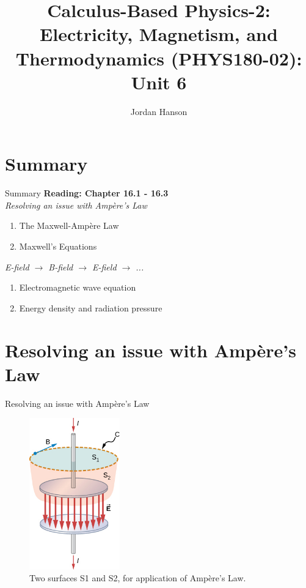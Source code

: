 \documentclass{beamer}
\title{Calculus-Based Physics-2: Electricity, Magnetism, and Thermodynamics (PHYS180-02): Unit 6}
\author{Jordan Hanson}
\institute{Whittier College Department of Physics and Astronomy}
\begin{document}
\maketitle

\section{Summary}

\begin{frame}{Summary}
\textbf{Reading: Chapter 16.1 - 16.3} \\ \vspace{0.5cm}
\textit{Resolving an issue with Amp\`{e}re's Law}
\begin{enumerate}
\item The Maxwell-Amp\`{e}re Law
\item Maxwell's Equations
\end{enumerate}
\textit{E-field $\rightarrow$ B-field $\rightarrow$ E-field $\rightarrow$ ...}
\begin{enumerate}
\item Electromagnetic wave equation
\item Energy density and radiation pressure
\end{enumerate}
\end{frame}

\section{Resolving an issue with  Amp\`{e}re's Law}

\begin{frame}{Resolving an issue with  Amp\`{e}re's Law}
\begin{figure}
\centering
\includegraphics[width=0.35\textwidth]{figures/surface.jpeg}
\caption{\label{fig:surf} Two surfaces S1 and S2, for application of Amp\`{e}re's Law.}
\end{figure}
\end{frame}
\end{document}
